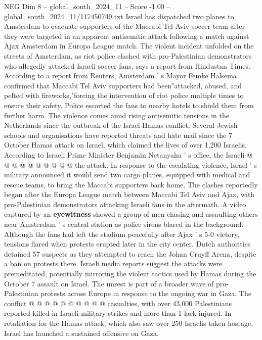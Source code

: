 \begin{textsample}{NEG Dim 8 – global\_south\_2024\_11 – Score -1.00 – global\_south\_2024\_11/117450749.txt}  \label{ex:f8_neg_318}
Israel has dispatched two planes to Amsterdam to evacuate supporters of the Maccabi Tel Aviv soccer team after they were targeted in an apparent antisemitic attack following a match against Ajax Amsterdam in Europa League match.
The violent incident unfolded on the streets of Amsterdam, as riot police clashed with pro-Palestinian demonstrators who allegedly attacked Israeli soccer fans, says a report from Hindustan Times.
According to a report from Reuters, Amsterdam ' s Mayor Femke Halsema confirmed that Maccabi Tel Aviv supporters had been"attacked, abused, and pelted with fireworks,"forcing the intervention of riot police multiple times to ensure their safety.
Police escorted the fans to nearby hotels to shield them from further harm.
The violence comes amid rising antisemitic tensions in the Netherlands since the outbreak of the Israel-Hamas conflict.
Several Jewish schools and organisations have reported threats and hate mail since the 7 October Hamas attack on Israel, which claimed the lives of over 1,200 Israelis.
According to Israeli Prime Minister Benjamin Netanyahu ' s office, the Israeli @ @ @ @ @ @ @ @ @ @ the attack.
In response to the escalating violence, Israel ' s military announced it would send two cargo planes, equipped with medical and rescue teams, to bring the Maccabi supporters back home.
The clashes reportedly began after the Europa League match between Maccabi Tel Aviv and Ajax, with pro-Palestinian demonstrators attacking Israeli fans in the aftermath.
A video captured by an \textbf{eyewitness} showed a group of men chasing and assaulting others near Amsterdam ' s central station as police sirens blared in the background.
Although the fans had left the stadium peacefully after Ajax ' s 5-0 victory, tensions flared when protests erupted later in the city center.
Dutch authorities detained 57 suspects as they attempted to reach the Johan Cruyff Arena, despite a ban on protests there.
Israeli media reports suggest the attacks were premeditated, potentially mirroring the violent tactics used by Hamas during the October 7 assault on Israel.
The unrest is part of a broader wave of pro-Palestinian protests across Europe in response to the ongoing war in Gaza.
The conflict @ @ @ @ @ @ @ @ @ @ casualties, with over 43,000 Palestinians reported killed in Israeli military strikes and more than 1 lack injured.
In retaliation for the Hamas attack, which also saw over 250 Israelis taken hostage, Israel has launched a sustained offensive on Gaza.

\end{textsample}
